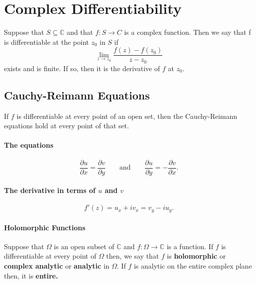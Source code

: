 \documentclass[12pt, letterpaper]{article}
\begin{document}

    \section{Complex Differentiability}
    Suppose that \(S \subseteq\mathbb{C}\) and that \(f : S \to C\) is a complex function.
    Then we say that f is differentiable at the point \(z_0\) in \(S\) if
    \[ 
        \lim_{z\to z_0} \frac{f(z) - f(z_0)}{z-z_0}\]
    exists and is finite. If so, then it is the derivative of \(f\) at \(z_0\).

    \subsection{Cauchy-Reimann Equations}
    If \(f\) is differentiable at every point of an open set, then the Cauchy-Reimann equations hold at every point of that set.
    \paragraph{The equations}
    \[
        \frac{\partial u}{\partial x} = \frac{\partial v}{\partial y}
        \quad \quad \text{and} \quad \quad
        \frac{\partial u}{\partial y} = -\frac{\partial v}{\partial x}.
    \]

    \paragraph{The derivative in terms of \(u\) and \(v\)}
    \[
        f'(z) = u_x + i v_x = v_y  - i u_y.
    \]
    
    \paragraph{Holomorphic Functions}
    Suppose that \(\Omega\) is an open subset of \(\mathbb{C}\) and 
    \(f: \Omega \to \mathbb{C}\) is a function. If \(f\) is differentiable
    at every point of \(\Omega\) then, we say that \(f\) is \textbf{holomorphic}
    or \textbf{complex analytic} or \textbf{analytic} in \(\Omega\).
    If \(f\) is analytic on the entire complex plane then, it is \textbf{entire.}

\end{document}
